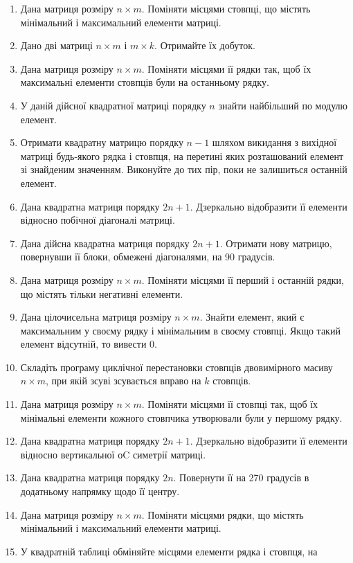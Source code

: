 \documentclass[a5paper,titlepage,openany,twoside,
]
{book_unv}%
\begin{document}
\begin{enumerate}
\item
  Дана матриця розміру $n \times m$. Поміняти місцями стовпці, що містять
  мінімальний і максимальний елементи матриці.
\item
  Дано дві матриці $n \times m$ і $m \times k$. Отримайте їх добуток.
\item
  Дана матриця розміру $n \times m$. Поміняти місцями її рядки так, щоб їх
  максимальні елементи стовпців були на останньому рядку.
\item
  У даній дійсної квадратної матриці порядку $n$ знайти найбільший по
  модулю елемент.
\item
  Отримати квадратну матрицю порядку $n - 1$ шляхом викидання з вихідної
  матриці будь-якого рядка і стовпця, на перетині яких розташований
  елемент зі знайденим значенням. Виконуйте до тих пір, поки не
  залишиться останній елемент.
\item
  Дана квадратна матриця порядку $2n + 1$. Дзеркально відобразити її
  елементи відносно побічної діагоналі матриці.
\item
  Дана дійсна квадратна матриця порядку $2n + 1$. Отримати нову матрицю,
  повернувши її блоки, обмежені діагоналями, на 90 градусів.
\item
  Дана матриця розміру $n \times m$. Поміняти місцями її перший і останній
  рядки, що містять тільки негативні елементи.
\item
  Дана цілочисельна матриця розміру $n \times m$. Знайти елемент, який є
  максимальним у своєму рядку і мінімальним в своєму стовпці. Якщо такий
  елемент відсутній, то вивести 0.
\item
  Складіть програму циклічної перестановки стовпців двовимірного масиву
  $n \times m$, при якій зсуві зсувається вправо на $k$ стовпців.
\item
  Дана матриця розміру $n \times m$. Поміняти місцями її стовпці так, щоб їх
  мінімальні елементи кожного стовпчика утворювали були у першому рядку.
\item
  Дана квадратна матриця порядку $2n + 1$. Дзеркально відобразити її
  елементи відносно вертикальної оC симетрії матриці.
\item
  Дана квадратна матриця порядку $2n$. Повернути її на 270 градусів в
  додатньому напрямку щодо її центру.
\item
  Дана матриця розміру $n \times m$. Поміняти місцями рядки, що містять
  мінімальний і максимальний елементи матриці.
\item
  У квадратній таблиці обміняйте місцями елементи рядка і стовпця, на

\end{enumerate}
\end{document}
